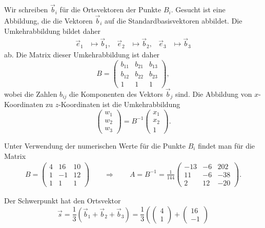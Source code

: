 \begin{loesung}
\begin{teilaufgaben}
\item
Wir schreiben $\vec b_i$ für die Ortsvektoren der Punkte $B_i$.
Gesucht ist eine Abbildung, die die Vektoren $\vec b_i$ auf die
Standardbasisvektoren abbildet.
Die Umkehrabbildung bildet daher
\[
\begin{aligned}
\vec e_1&\mapsto\vec b_1,&
\vec e_2&\mapsto\vec b_2,&
\vec e_3&\mapsto\vec b_3
\end{aligned}
\]
ab.
Die Matrix dieser Umkehrabbildung ist daher
\[
B
=
\begin{pmatrix}
b_{11}&b_{21}&b_{13}\\
b_{12}&b_{22}&b_{23}\\
     1&     1&     1
\end{pmatrix},
\]
wobei die Zahlen $b_{ij}$ die Komponenten des Vektors $\vec b_j$ sind.
Die Abbildung von $x$-Koordinaten zu $z$-Koordinaten ist die Umkehrabbildung
\[
\begin{pmatrix}
w_1\\w_2\\w_3
\end{pmatrix}
=
B^{-1}\begin{pmatrix}
x_1\\x_2\\1
\end{pmatrix}.
\]
\item
Unter Verwendung der numerischen Werte für die Punkte $B_i$ findet man für
die Matrix
\begin{align*}
B=\begin{pmatrix}
 4&16&10\\
 1&-1&12\\
 1& 1& 1
\end{pmatrix}
\qquad
\Rightarrow
\qquad
A=
B^{-1}=\frac1{144}\begin{pmatrix}
-13&-6&202\\
 11&-6&-38\\
  2&12&-20
\end{pmatrix}.
\end{align*}
\item
Der Schwerpunkt hat den Ortsvektor
\[
\vec s = \frac13(\vec b_1+\vec b_2+\vec b_3)
=
\frac13\left(
\begin{pmatrix}  4\\ 1 \end{pmatrix}
+
\begin{pmatrix} 16\\-1 \end{pmatrix}
\]
\end{teilaufgaben}
\end{loesung}
